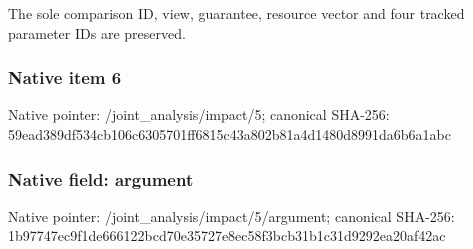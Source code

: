 \documentclass[10pt,a4paper]{article}
\begin{document}
\begingroup\raggedright\sloppy The sole comparison ID,\allowbreak{} view,\allowbreak{} guarantee,\allowbreak{} resource vector and four tracked parameter IDs are preserved.\par\endgroup

\subsubsection{Native item 6}
Native pointer: /joint\_\allowbreak{}analysis/impact/5; canonical SHA-256: 59ead389df534cb106c6305701ff6815c43a802b81a4d1480d8991da6b6a1abc

\subsubsection{Native field: argument}
Native pointer: /joint\_\allowbreak{}analysis/impact/5/argument; canonical SHA-256: 1b97747ec9f1de666122bcd70e35727e8ec58f3bcb31b1c31d9292ea20af42ac
\end{document}

